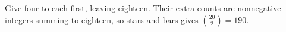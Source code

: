 Give four to each first, leaving eighteen. Their extra counts are nonnegative integers summing to eighteen, so stars and bars gives $\binom{20}{2}=\boxed{190}$.
